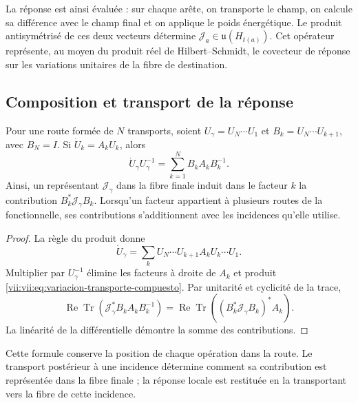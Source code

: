 La réponse est ainsi évaluée : sur chaque arête, on transporte le champ, on calcule sa différence avec le champ final et on applique le poids énergétique. Le produit antisymétrisé de ces deux vecteurs détermine \(\mathcal J_a\in\mathfrak u(H_{t(a)})\). Cet opérateur représente, au moyen du produit réel de Hilbert--Schmidt, le covecteur de réponse sur les variations unitaires de la fibre de destination.

\subsection{Composition et transport de la réponse}
\label{vii:vii:subsec:composicion-respuesta}

\begin{proposition}
\label{vii:vii:prop:composicion-respuesta}
Pour une route formée de \(N\) transports, soient
\(U_\gamma=U_N\cdots U_1\) et
\(B_k=U_N\cdots U_{k+1}\), avec \(B_N=I\).
Si \(\dot U_k=A_kU_k\), alors
\begin{equation}
 \dot U_\gamma U_\gamma^{-1}
 =\sum_{k=1}^N B_kA_kB_k^{-1}.
 \label{vii:vii:eq:variacion-transporte-compuesto}
\end{equation}
Ainsi, un représentant \(\mathcal J_\gamma\) dans la fibre finale
induit dans le facteur \(k\) la contribution
\(B_k^*\mathcal J_\gamma B_k\). Lorsqu'un facteur appartient à plusieurs
routes de la fonctionnelle, ses contributions s'additionnent avec les incidences
qu'elle utilise.
\end{proposition}

\begin{proof}
La règle du produit donne
\[
 \dot U_\gamma=\sum_k
 U_N\cdots U_{k+1}A_kU_k\cdots U_1.
\]
Multiplier par \(U_\gamma^{-1}\) élimine les facteurs à droite
de \(A_k\) et produit \eqref{vii:vii:eq:variacion-transporte-compuesto}.
Par unitarité et cyclicité de la trace,
\[
 \operatorname{Re}\operatorname{Tr}
   (\mathcal J_\gamma^*B_kA_kB_k^{-1})
 =\operatorname{Re}\operatorname{Tr}
   ((B_k^*\mathcal J_\gamma B_k)^*A_k).
\]
La linéarité de la différentielle démontre la somme des contributions.
\end{proof}

Cette formule conserve la position de chaque opération dans la route.
Le transport postérieur à une incidence détermine comment sa contribution
est représentée dans la fibre finale ; la réponse locale est restituée
en la transportant vers la fibre de cette incidence.

